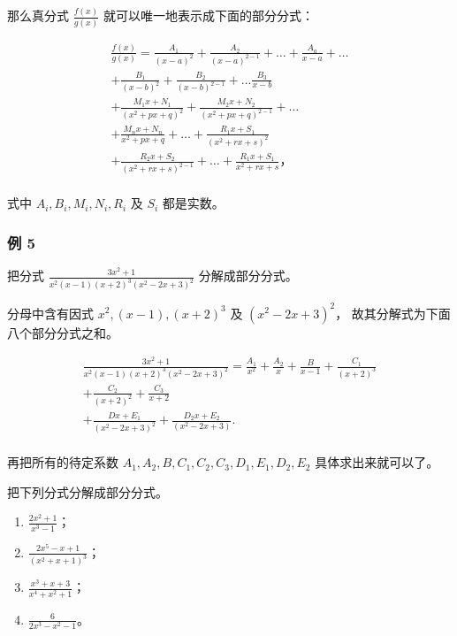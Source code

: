 那么真分式 \(\frac{f(x)}{g(x)}\) 就可以唯一地表示成下面的部分分式：

\[
\begin{array}{l} \frac {f (x)}{g (x)} = \frac {A _ {1}}{(x - a) ^ {2}} + \frac {A _ {2}}{(x - a) ^ {2 - 1}} + \dots + \frac {A _ {a}}{x - a} + \dots \\ + \frac {B _ {1}}{(x - b) ^ {2}} + \frac {B _ {2}}{(x - b) ^ {2 - 1}} + \dots \frac {B _ {3}}{x - b} \\ + \frac {M _ {1} x + N _ {1}}{(x ^ {2} + p x + q) ^ {2}} + \frac {M _ {2} x + N _ {2}}{(x ^ {2} + p x + q) ^ {2 - 1}} + \dots \\ + \frac {M _ {n} x + N _ {n}}{x ^ {2} + p x + q} + \dots + \frac {R _ {1} x + S _ {1}}{(x ^ {2} + r x + s) ^ {2}} \\ + \frac {R _ {2} x + S _ {2}}{(x ^ {2} + r x + s) ^ {2 - 1}} + \dots + \frac {R _ {1} x + S _ {1}}{x ^ {2} + r x + s}\text{，} \tag {12} \\ \end{array}
\]

式中 \(A_{i}, B_{i}, M_{i}, N_{i}, R_{i}\) 及 \(S_{i}\) 都是实数。

\subsubsection{例 5}

把分式 \(\frac{3x^2 + 1}{x^2(x - 1)(x + 2)^3(x^2 - 2x + 3)^2}\)
分解成部分分式。

 分母中含有因式 \(x^{2}, (x - 1), (x + 2)^{3}\) 及
\((x^{2} - 2x + 3)^{2}\)， 故其分解式为下面八个部分分式之和。

\[
\begin{array}{l} \frac {3 x ^ {2} + 1}{x ^ {2} (x - 1) (x + 2) ^ {3} (x ^ {2} - 2 x + 3) ^ {2}} = \frac {A _ {1}}{x ^ {2}} + \frac {A _ {2}}{x} + \frac {B}{x - 1} + \frac {C _ {1}}{(x + 2) ^ {3}} \\ + \frac {C _ {2}}{(x + 2) ^ {2}} + \frac {C _ {3}}{x + 2} \\ + \frac {D x + E _ {1}}{(x ^ {2} - 2 x + 3) ^ {2}} + \frac {D _ {2} x + E _ {2}}{(x ^ {2} - 2 x + 3)}. \\ \end{array}
\]

再把所有的待定系数
\(A_{1}, A_{2}, B, C_{1}, C_{2}, C_{3}, D_{1}, E_{1}, D_{2}, E_{2}\)
具体求出来就可以了。

把下列分式分解成部分分式。

\begin{enumerate}
\item
  \(\frac{2x^2 + 1}{x^3 - 1}\)；
\item
  \(\frac{2x^5 - x + 1}{(x^2 + x + 1)^3}\)；
\item
  \(\frac{x^3 + x + 3}{x^4 + x^2 + 1}\)；
\item
  \(\frac{6}{2x^3 - x^2 - 1}\)。
\end{enumerate}

